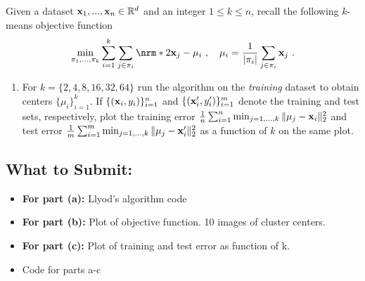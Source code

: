 \documentclass{article}
\begin{document}
\begin{aprob}
Given a dataset $\mathbf{x}_1,..., \mathbf{x}_n \in \mathbb{R}^{d}$ and an integer $1 \leq k \leq n$, recall the following $k$-means objective function
\begin{align}
    \min_{\pi_1, ..., \pi_k} \sum_{i=1}^{k} \sum_{j \in \pi_i} \norm{2}{ \bx_j - \mu_{i} } \ , \quad \mu_i = \frac{1}{|\pi_i|} \sum_{j \in \pi_i} \bx_j \ . \label{eq:kmeans_obj}
\end{align}

\medskip


\begin{enumerate}
    

    \item {} For $k=\{2, 4, 8, 16, 32, 64\}$ run the algorithm on the \emph{training} dataset to obtain centers $\{\mu_{i}\}_{i=1}^k$. If $\{(\mathbf{x}_i,y_i)\}_{i=1}^n$ and $\{(\mathbf{x}_i',y_i')\}_{i=1}^m$ denote the training and test sets, respectively, plot the training error $\frac{1}{n} \sum_{i=1}^n \min_{j=1,\dots,k} \| \mu_j - \mathbf{x}_i \|_2^2$ and test error $\frac{1}{m} \sum_{i=1}^m \min_{j=1,\dots,k} \| \mu_j - \mathbf{x}_i' \|_2^2$ as a function of $k$ on the same plot.
\end{enumerate}
 \subsection*{What to Submit:}
    \begin{itemize}
        \item \textbf{For part (a):} Llyod’s algorithm code
        \item \textbf{For part (b):} Plot of objective function. 10 images of cluster centers.
        \item \textbf{For part (c):} Plot of training and test error as function of k.
        \item Code for parts a-c
    \end{itemize}


\end{aprob}
\end{document}
